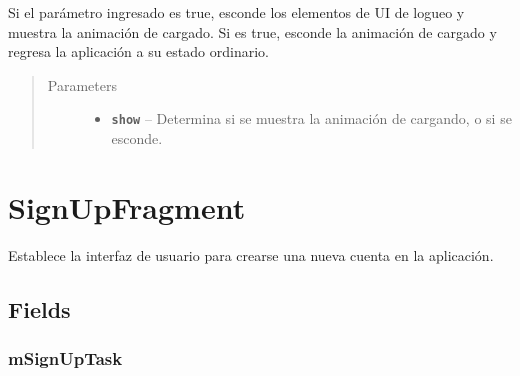 \documentclass[letterpaper,10pt,english]{sphinxmanual}
\begin{document}
\begin{fulllineitems}
\label{Fragments/LogInFragment:com.fiuba.tallerii.jobify.LogInFragment.showProgress(boolean)}
Si el parámetro ingresado es true, esconde los elementos de UI de logueo y muestra la animación de cargado. Si es true, esconde la animación de cargado y regresa la aplicación a su estado ordinario.
\begin{quote}\begin{description}
\item[{Parameters}] \leavevmode\begin{itemize}
\item {} 
\textbf{\texttt{show}} -- Determina si se muestra la animación de cargando, o si se esconde.

\end{itemize}

\end{description}\end{quote}

\end{fulllineitems}



\section{SignUpFragment}
\label{Fragments/SignUpFragment:signupfragment}\label{Fragments/SignUpFragment::doc}

\begin{fulllineitems}
\label{Fragments/SignUpFragment:com.fiuba.tallerii.jobify.SignUpFragment}
Establece la interfaz de usuario para crearse una nueva cuenta en la aplicación.

\end{fulllineitems}



\subsection{Fields}
\label{Fragments/SignUpFragment:fields}

\subsubsection{mSignUpTask}
\label{Fragments/SignUpFragment:msignuptask}
\end{document}
